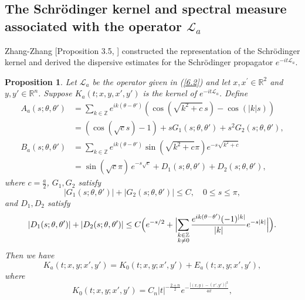 \documentclass[a4paper,11pt, reqno]{amsart}
\numberwithin{equation}{section}
\theoremstyle{plain}
\newtheorem{proposition}[theorem]{Proposition}
\theoremstyle{definition}
\theoremstyle{remark}
\begin{document}
\subsection{The Schr\"odinger kernel and spectral measure associated with the operator $\mathcal{L}_a$}
Zhang-Zhang [Proposition 3.5, ] constructed the representation of the Schrödinger kernel and derived the dispersive estimates for the Schr\"odinger propagator $e^{-it\mathcal{L}_a}$.
\begin{proposition}\label{Prop 6.2}
Let \( \mathcal{L}_a \) be the operator given in (\ref{6.2}) and let \( x, x^{\prime} \in \mathbb{R}^2 \) and \( y, y' \in \mathbb{R}^n \). Suppose \( K_a(t; x, y, x', y') \) is the kernel of \( e^{-it\mathcal{L}_a} \). Define
\begin{equation}\label{A-B}
\begin{aligned}
A_a(s; \theta, \theta') &=\sum_{k\in \mathbb{Z}}e^{ik(\theta -\theta ')}\left( \cos(\sqrt{k^2+c}\,s)-\cos(|k|s) \right)\\
                        &= \left( \cos(\sqrt{c} s) - 1 \right) + sG_1(s; \theta, \theta') + s^2G_2(s; \theta, \theta'), \\
B_a(s; \theta, \theta') &=\sum_{k \in \mathbb{Z}} e^{ik(\theta - \theta')} \sin(\sqrt{k^2 + c}\pi) e^{-s\sqrt{k^2 + c}}\\
                        &= \sin(\sqrt{c} \pi) \, e^{-s\sqrt{c}} + D_1(s; \theta, \theta') + D_2(s; \theta, \theta'),
\end{aligned}
\end{equation}
where $c=\frac{a}{2}$, $G_1,G_2$ satisfy
\begin{equation}\label{G1-G2}
| G_1(s; \theta, \theta') | + | G_2(s; \theta, \theta') | \leq C, \quad 0 \leq s \leq \pi, 
\end{equation}
and $D_1, D_2$ satisfy
\begin{equation}\label{D1-D2}
	|D_1(s; \theta, \theta')| + |D_2(s; \theta, \theta')| \leq C\Bigl( e^{-s/2} + \Bigl| \sum_{\substack{k \in \mathbb{Z} \\ k \neq 0}} \frac{e^{ik(\theta - \theta')}(-1)^{|k|}}{|k|} e^{-s|k|} \Bigr| \Bigr).
\end{equation}
Then we have
\begin{equation*}
K_a(t; x, y; x', y') = K_0(t; x, y; x', y') + E_a(t; x, y; x', y'),
\end{equation*}
where 
\begin{equation*}
K_0(t; x, y; x', y') = C_n|t|^{-\frac{2+n}{2}}e^{-\frac{|(x,y)-(x',y')|^2}{4it}},

\end{equation*}
\end{proposition}
\end{document}
